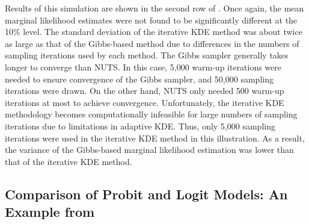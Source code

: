 \documentclass[twocolumn]{article}
\begin{document}
Results of this simulation are shown in the second row of . Once again, the mean marginal likelihood estimates were not found to be significantly different at the 10\% level. The standard deviation of the iterative KDE method was about twice as large as that of the Gibbs-based method due to differences in the numbers of sampling iterations used by each method. The Gibbs sampler generally takes longer to converge than NUTS. In this case, 5,000 warm-up iterations were needed to ensure convergence of the Gibbs sampler, and 50,000 sampling iterations were drawn. On the other hand, NUTS only needed 500 warm-up iterations at most to achieve convergence. Unfortunately, the iterative KDE methodology becomes computationally infeasible for large numbers of sampling iterations due to limitations in adaptive KDE. Thus, only 5,000 sampling iterations were used in the iterative KDE method in this illustration. As a result, the variance of the Gibbs-based marginal likelihood estimation was lower than that of the iterative KDE method.

\subsection{Comparison of Probit and Logit Models: An Example from \cite{Chib}}
\end{document}
